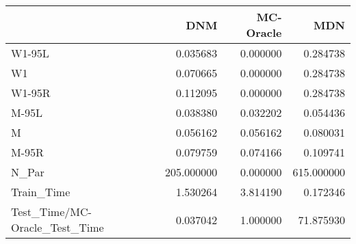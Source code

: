 \begin{tabular}{lrrr}
\toprule
{} &         DNM &  MC-Oracle &         MDN \\
\midrule
W1-95L                        &    0.035683 &   0.000000 &    0.284738 \\
W1                            &    0.070665 &   0.000000 &    0.284738 \\
W1-95R                        &    0.112095 &   0.000000 &    0.284738 \\
M-95L                         &    0.038380 &   0.032202 &    0.054436 \\
M                             &    0.056162 &   0.056162 &    0.080031 \\
M-95R                         &    0.079759 &   0.074166 &    0.109741 \\
N\_Par                         &  205.000000 &   0.000000 &  615.000000 \\
Train\_Time                    &    1.530264 &   3.814190 &    0.172346 \\
Test\_Time/MC-Oracle\_Test\_Time &    0.037042 &   1.000000 &   71.875930 \\
\bottomrule
\end{tabular}

